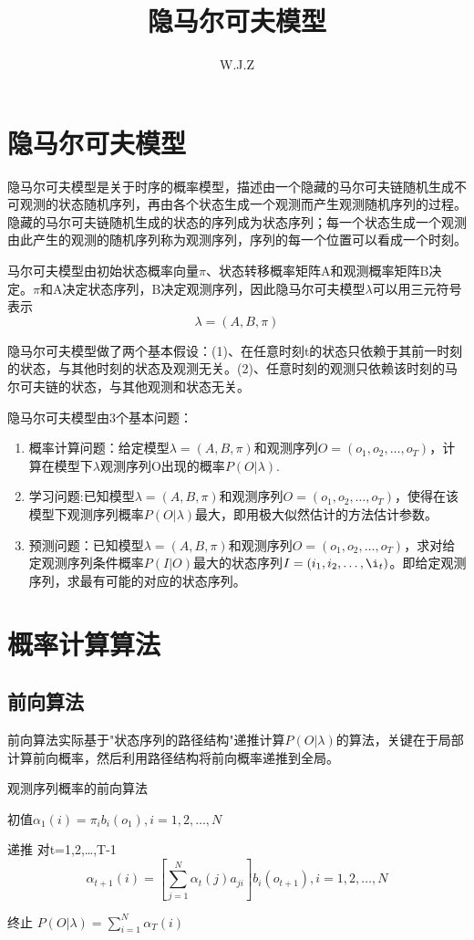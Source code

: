 \documentclass{article}
\title{隐马尔可夫模型}
\author{W.J.Z}
\date{}
\begin{document}
	\maketitle
	\section{隐马尔可夫模型}
	隐马尔可夫模型是关于时序的概率模型，描述由一个隐藏的马尔可夫链随机生成不可观测的状态随机序列，再由各个状态生成一个观测而产生观测随机序列的过程。隐藏的马尔可夫链随机生成的状态的序列成为状态序列；每一个状态生成一个观测由此产生的观测的随机序列称为观测序列，序列的每一个位置可以看成一个时刻。
	
	马尔可夫模型由初始状态概率向量$\pi$、状态转移概率矩阵A和观测概率矩阵B决定。$\pi$和A决定状态序列，B决定观测序列，因此隐马尔可夫模型$\lambda $可以用三元符号表示$$\lambda =\left ( A,B,\pi \right )$$
	
	隐马尔可夫模型做了两个基本假设：(1)、在任意时刻t的状态只依赖于其前一时刻的状态，与其他时刻的状态及观测无关。(2)、任意时刻的观测只依赖该时刻的马尔可夫链的状态，与其他观测和状态无关。
	
	隐马尔可夫模型由3个基本问题：
	\begin{enumerate}
		\item 概率计算问题：给定模型$\lambda =\left ( A,B,\pi \right )$和观测序列$O=\left ( o_{1},o_{2},\ldots,o_{T} \right )$，计算在模型下$\lambda $观测序列O出现的概率$P(O|\lambda )$.
		\item 学习问题:已知模型$\lambda =\left ( A,B,\pi \right )$和观测序列$O=\left ( o_{1},o_{2},\ldots,o_{T} \right )$，使得在该模型下观测序列概率$P(O|\lambda )$最大，即用极大似然估计的方法估计参数。
		\item 预测问题：已知模型$\lambda =\left ( A,B,\pi \right )$和观测序列$O=\left ( o_{1},o_{2},\ldots,o_{T} \right )$，求对给定观测序列条件概率$P(I|O)$最大的状态序列$I=\left ( i_{1},i_{2},\ldots,\i_{t} \right )$。即给定观测序列，求最有可能的对应的状态序列。
	\end{enumerate}
 
 \section{概率计算算法}
 \subsection{前向算法}
 前向算法实际基于"状态序列的路径结构"递推计算$P(O|\lambda )$的算法，关键在于局部计算前向概率，然后利用路径结构将前向概率递推到全局。
 \begin{algorithm}
 	\caption{观测序列概率的前向算法}
 	\LinesNumbered
 	初值$\alpha _{1}\left ( i \right )=\pi_{i}b_{i}\left ( o_{1} \right ),i=1,2,\ldots,N$
 	
 	递推 对t=1,2,\ldots,T-1
 	$$\alpha _{t+1}\left ( i \right )=\left [ \sum_{j=1}^{N}\alpha _{t}\left ( j \right )a_{ji} \right ]b_{i}\left ( o_{t+1} \right ),i=1,2,\ldots,N$$
 	
 	终止 $P(O|\lambda )=\sum_{i=1}^{N}\alpha _{T}\left ( i \right )$
 \end{algorithm}
\end{document}
